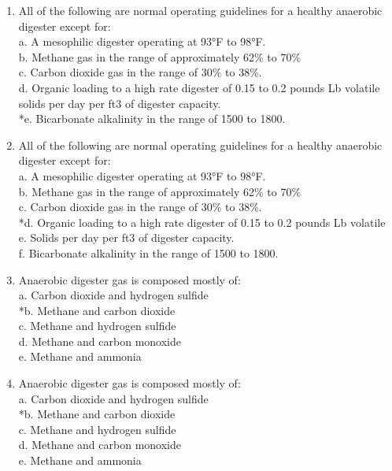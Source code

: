 \documentclass{article}
\begin{document}
\begin{enumerate}
\item  All of the following are normal operating guidelines for a healthy anaerobic digester except for: \\

a. A mesophilic digester operating at 93°F to 98°F. \\
b. Methane gas in the range of approximately 62\% to 70\% \\
c. Carbon dioxide gas in the range of 30\% to 38\%. \\
d. Organic loading to a high rate digester of 0.15 to 0.2 pounds Lb volatile solids per day per ft3 of digester capacity. \\
*e. Bicarbonate alkalinity in the range of 1500 to 1800. \\

\item  All of the following are normal operating guidelines for a healthy anaerobic digester except for: \\

a. A mesophilic digester operating at 93°F to 98°F. \\
b. Methane gas in the range of approximately 62\% to 70\% \\
c. Carbon dioxide gas in the range of 30\% to 38\%. \\
*d. Organic loading to a high rate digester of 0.15 to 0.2 pounds Lb volatile \\
e. Solids per day per ft3 of digester capacity. \\
f. Bicarbonate alkalinity in the range of 1500 to 1800. \\

\item  Anaerobic digester gas is composed mostly of: \\

a. Carbon dioxide and hydrogen sulfide \\
*b. Methane and carbon dioxide \\
c. Methane and hydrogen sulfide \\
d. Methane and carbon monoxide \\
e. Methane and ammonia \\

\item  Anaerobic digester gas is composed mostly of: \\

a. Carbon dioxide and hydrogen sulfide \\
*b. Methane and carbon dioxide \\
c. Methane and hydrogen sulfide \\
d. Methane and carbon monoxide \\
e. Methane and ammonia \\


\end{enumerate}
\end{document}
